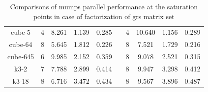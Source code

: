 \begin{table}[htpb]
\begin{tabular}{c|c|c|c|c|c|c|c|c|c|}
\multicolumn{1}{|c|}{cube-5}                                                & 4   & 8.261                                                              & 1.139                                              & 0.285                                                  & \multicolumn{1}{c|}{} & 4   & 10.640                                                             & 1.156                                              & 0.289                                                  \\ \cline{1-5} \cline{7-10} 
\multicolumn{1}{|c|}{cube-64}                                               & 8   & 5.645                                                              & 1.812                                              & 0.226                                                  & \multicolumn{1}{c|}{} & 8   & 7.521                                                              & 1.729                                              & 0.216                                                  \\ \cline{1-5} \cline{7-10} 
\multicolumn{1}{|c|}{cube-645}                                              & 6   & 9.985                                                              & 2.152                                              & 0.359                                                  & \multicolumn{1}{c|}{} & 8   & 9.078                                                              & 2.521                                              & 0.315                                                  \\ \cline{1-5} \cline{7-10} 
\multicolumn{1}{|c|}{k3-2}                                                  & 7   & 7.788                                                              & 2.899                                              & 0.414                                                  & \multicolumn{1}{c|}{} & 8   & 9.947                                                              & 3.298                                              & 0.412                                                  \\ \cline{1-5} \cline{7-10} 
\multicolumn{1}{|c|}{k3-18}                                                 & 8   & 6.716                                                              & 3.472                                              & 0.434                                                  & \multicolumn{1}{c|}{} & 8   & 9.567                                                              & 3.896                                              & 0.487                                                  \\ \cline{1-5} \cline{7-10} 
\end{tabular}
\caption{Comparisons of \acrshort{mumps} parallel performance at the saturation points in case of factorization of \acrshort{grs} matrix set}
\label{table:pinning-comparison-grs-matrix-set}
\end{table}




